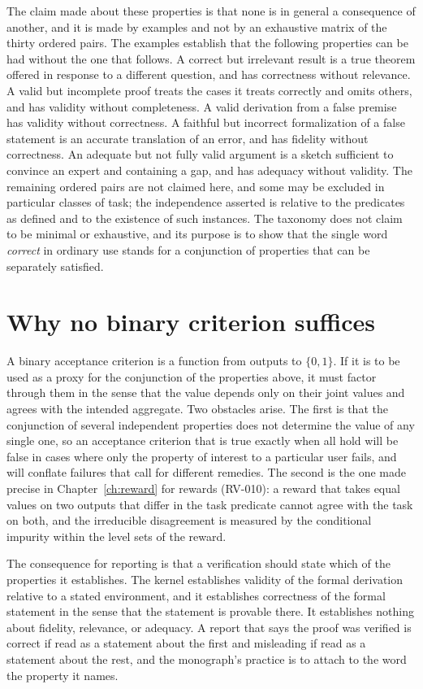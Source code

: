 The claim made about these properties is that none is in general a consequence of another, and it is made by examples and not by an exhaustive matrix of the thirty ordered pairs. The examples establish that the following properties can be had without the one that follows. A correct but irrelevant result is a true theorem offered in response to a different question, and has correctness without relevance. A valid but incomplete proof treats the cases it treats correctly and omits others, and has validity without completeness. A valid derivation from a false premise has validity without correctness. A faithful but incorrect formalization of a false statement is an accurate translation of an error, and has fidelity without correctness. An adequate but not fully valid argument is a sketch sufficient to convince an expert and containing a gap, and has adequacy without validity. The remaining ordered pairs are not claimed here, and some may be excluded in particular classes of task; the independence asserted is relative to the predicates as defined and to the existence of such instances. The taxonomy does not claim to be minimal or exhaustive, and its purpose is to show that the single word \emph{correct} in ordinary use stands for a conjunction of properties that can be separately satisfied.

\section{Why no binary criterion suffices}

A binary acceptance criterion is a function from outputs to $\{0,1\}$. If it is to be used as a proxy for the conjunction of the properties above, it must factor through them in the sense that the value depends only on their joint values and agrees with the intended aggregate. Two obstacles arise. The first is that the conjunction of several independent properties does not determine the value of any single one, so an acceptance criterion that is true exactly when all hold will be false in cases where only the property of interest to a particular user fails, and will conflate failures that call for different remedies. The second is the one made precise in Chapter~\ref{ch:reward} for rewards (RV-010): a reward that takes equal values on two outputs that differ in the task predicate cannot agree with the task on both, and the irreducible disagreement is measured by the conditional impurity within the level sets of the reward.

The consequence for reporting is that a verification should state which of the properties it establishes. The kernel establishes validity of the formal derivation relative to a stated environment, and it establishes correctness of the formal statement in the sense that the statement is provable there. It establishes nothing about fidelity, relevance, or adequacy. A report that says the proof was verified is correct if read as a statement about the first and misleading if read as a statement about the rest, and the monograph's practice is to attach to the word the property it names.

